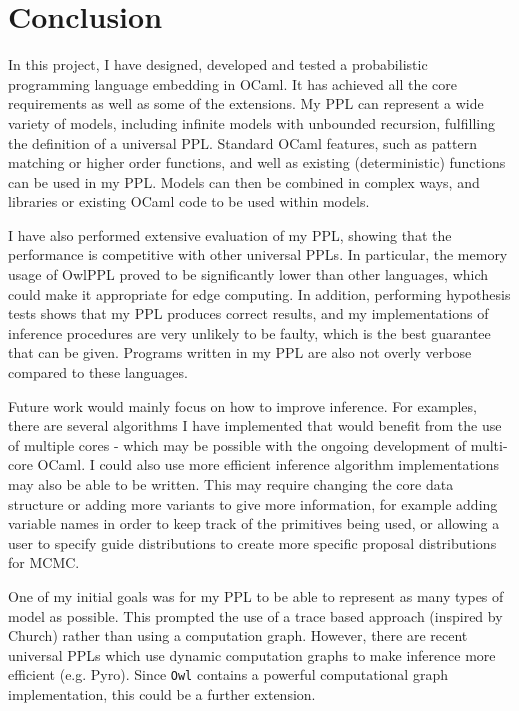 \chapter{Conclusion}

In this project, I have designed, developed and tested a probabilistic programming language embedding in OCaml. It has achieved all the core requirements as well as some of the extensions. My PPL can represent a wide variety of models, including infinite models with unbounded recursion, fulfilling the definition of a universal PPL. Standard OCaml features, such as pattern matching or higher order functions, and well as existing (deterministic) functions can be used in my PPL. Models can then be combined in complex ways, and libraries or existing OCaml code to be used within models.

I have also performed extensive evaluation of my PPL, showing that the performance is competitive with other universal PPLs. In particular, the memory usage of OwlPPL proved to be significantly lower than other languages, which could make it appropriate for edge computing. In addition, performing hypothesis tests shows that my PPL produces correct results, and my implementations of inference procedures are very unlikely to be faulty, which is the best guarantee that can be given. Programs written in my PPL are also not overly verbose compared to these languages.


Future work would mainly focus on how to improve inference. For examples, there are several algorithms I have implemented that would benefit from the use of multiple cores - which may be possible with the ongoing development of multi-core OCaml. I could also use more efficient inference algorithm implementations may also be able to be written. This may require changing the core data structure or adding more variants to give more information, for example adding variable names in order to keep track of the primitives being used, or allowing a user to specify guide distributions to create more specific proposal distributions for MCMC.

One of my initial goals was for my PPL to be able to represent as many types of model as possible. This prompted the use of a trace based approach (inspired by Church) rather than using a computation graph. However, there are recent universal PPLs which use dynamic computation graphs to make inference more efficient (e.g. Pyro). Since \texttt{Owl} contains a powerful computational graph implementation, this could be a further extension.

